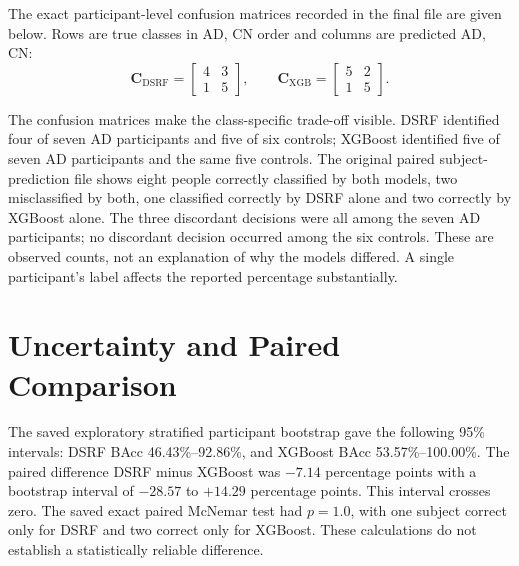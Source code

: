The exact participant-level confusion matrices recorded in the final file are given below. Rows are true classes in AD, CN order and columns are predicted AD, CN:
\begin{equation}
\mathbf C_{\mathrm{DSRF}}=\begin{bmatrix}4&3\\1&5\end{bmatrix},\qquad
\mathbf C_{\mathrm{XGB}}=\begin{bmatrix}5&2\\1&5\end{bmatrix}.
\label{eq:confusion}
\end{equation}

The confusion matrices make the class-specific trade-off visible. DSRF identified four of seven AD participants and five of six controls; XGBoost identified five of seven AD participants and the same five controls. The original paired subject-prediction file shows eight people correctly classified by both models, two misclassified by both, one classified correctly by DSRF alone and two correctly by XGBoost alone. The three discordant decisions were all among the seven AD participants; no discordant decision occurred among the six controls. These are observed counts, not an explanation of why the models differed. A single participant's label affects the reported percentage substantially.

\section{Uncertainty and Paired Comparison}
The saved exploratory stratified participant bootstrap gave the following 95\% intervals: DSRF BAcc 46.43\%--92.86\%, and XGBoost BAcc 53.57\%--100.00\%. The paired difference DSRF minus XGBoost was $-7.14$ percentage points with a bootstrap interval of $-28.57$ to $+14.29$ percentage points. This interval crosses zero. The saved exact paired McNemar test had $p=1.0$, with one subject correct only for DSRF and two correct only for XGBoost. These calculations do not establish a statistically reliable difference.


